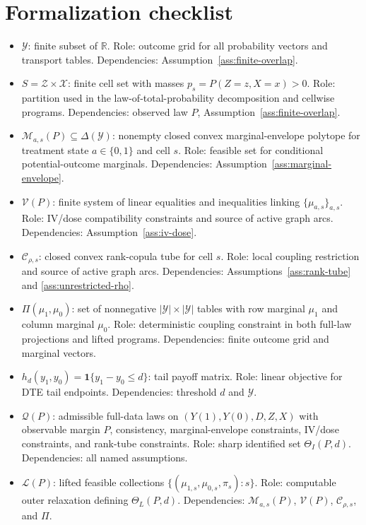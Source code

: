 \documentclass[11pt]{article}
\newcommand{\one}{\mathbf{1}}
\theoremstyle{definition}
\theoremstyle{plain}
\theoremstyle{remark}
\begin{document}
\section{Formalization checklist}
\begin{itemize}[leftmargin=*]
\item \(\mathcal Y\): finite subset of \(\mathbb R\).  Role: outcome grid for all probability vectors and transport tables.  Dependencies: Assumption~\ref{ass:finite-overlap}.
\item \(S=\mathcal Z\times\mathcal X\): finite cell set with masses \(p_s=P(Z=z,X=x)>0\).  Role: partition used in the law-of-total-probability decomposition and cellwise programs.  Dependencies: observed law \(P\), Assumption~\ref{ass:finite-overlap}.
\item \(\mathcal M_{a,s}(P)\subseteq\Delta(\mathcal Y)\): nonempty closed convex marginal-envelope polytope for treatment state \(a\in\{0,1\}\) and cell \(s\).  Role: feasible set for conditional potential-outcome marginals.  Dependencies: Assumption~\ref{ass:marginal-envelope}.
\item \(\mathcal V(P)\): finite system of linear equalities and inequalities linking \(\{\mu_{a,s}\}_{a,s}\).  Role: IV/dose compatibility constraints and source of active graph arcs.  Dependencies: Assumption~\ref{ass:iv-dose}.
\item \(\mathcal C_{\rho,s}\): closed convex rank-copula tube for cell \(s\).  Role: local coupling restriction and source of active graph arcs.  Dependencies: Assumptions~\ref{ass:rank-tube} and \ref{ass:unrestricted-rho}.
\item \(\Pi(\mu_1,\mu_0)\): set of nonnegative \(|\mathcal Y|\times|\mathcal Y|\) tables with row marginal \(\mu_1\) and column marginal \(\mu_0\).  Role: deterministic coupling constraint in both full-law projections and lifted programs.  Dependencies: finite outcome grid and marginal vectors.
\item \(h_d(y_1,y_0)=\one\{y_1-y_0\le d\}\): tail payoff matrix.  Role: linear objective for DTE tail endpoints.  Dependencies: threshold \(d\) and \(\mathcal Y\).
\item \(\mathcal Q(P)\): admissible full-data laws on \((Y(1),Y(0),D,Z,X)\) with observable margin \(P\), consistency, marginal-envelope constraints, IV/dose constraints, and rank-tube constraints.  Role: sharp identified set \(\Theta_I(P,d)\).  Dependencies: all named assumptions.
\item \(\mathcal L(P)\): lifted feasible collections \(\{(\mu_{1,s},\mu_{0,s},\pi_s):s\}\).  Role: computable outer relaxation defining \(\Theta_L(P,d)\).  Dependencies: \(\mathcal M_{a,s}(P)\), \(\mathcal V(P)\), \(\mathcal C_{\rho,s}\), and \(\Pi\).

\end{itemize}
\end{document}
